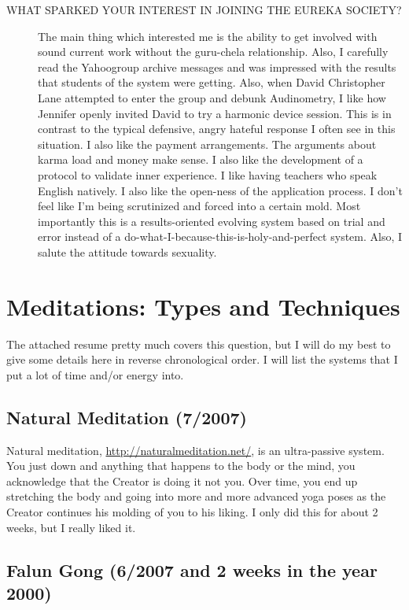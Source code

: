 \documentclass[12pt]{article}%
\begin{document}
\begin{description}
	\item[WHAT SPARKED YOUR INTEREST IN JOINING THE EUREKA SOCIETY?] The main thing which interested me is the ability to get involved with sound current work without the guru-chela relationship. Also, I carefully read the Yahoogroup archive messages and was impressed with the results that students of the system were getting. Also, when David Christopher Lane attempted to enter the group and debunk Audinometry, I like how Jennifer openly invited David to try a harmonic device session. This is in contrast to the typical defensive, angry hateful response I often see in this situation. I also like the payment arrangements. The arguments about karma load and money make sense. I also like the development of a protocol to validate inner experience. I like having teachers who speak English natively. I also like the open-ness of the application process. I don't feel like I'm being scrutinized and forced into a certain mold. Most importantly this is a results-oriented evolving system based on trial and error instead of a do-what-I-because-this-is-holy-and-perfect system. Also, I salute the attitude towards sexuality.
	
	 
	
\end{description}

\section{Meditations: Types and Techniques}
\label{sec:med}

The attached resume pretty much covers this question, but I will do my best to give some details here in reverse chronological order. I will list the systems that I put a lot of time and/or energy into.

\subsection{Natural Meditation (7/2007)}

Natural meditation, \url{http://naturalmeditation.net/}, is an ultra-passive system. You just down and anything that happens to the body or the mind, you acknowledge that the Creator is doing it not you. Over time, you end up stretching the body and going into more and more advanced yoga poses as the Creator continues his molding of you to his liking. I only did this for about 2 weeks, but I really liked it.

\subsection{Falun Gong (6/2007 and 2 weeks in the year 2000)}
\end{document}
